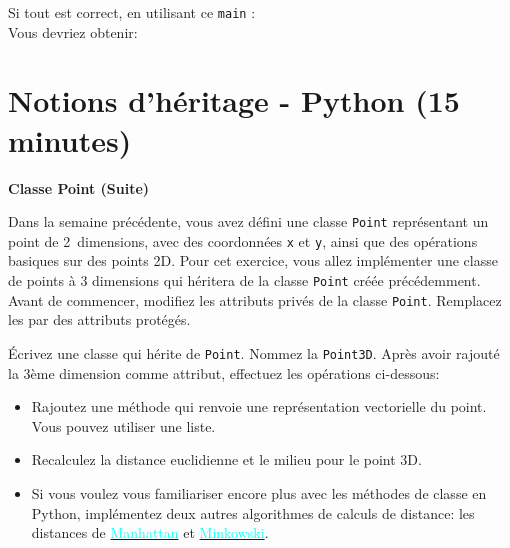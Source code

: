 Si tout est correct, en utilisant ce \lstinline{main} : \\

 

Vous devriez obtenir:
 



\section{Notions d'héritage - Python (15 minutes)}
\begin{Exercice}[15 minutes]\textbf{Classe Point (Suite)}

    Dans la semaine précédente, vous avez défini une classe \lstinline{Point} représentant un point de 2~dimensions, avec des coordonnées \lstinline{x} et \lstinline{y}, ainsi que des opérations basiques sur des points 2D. Pour cet exercice, vous allez implémenter une classe de points à 3 dimensions qui héritera de la classe \lstinline{Point} créée précédemment.
    Avant de commencer, modifiez les attributs privés de la classe \lstinline{Point}. Remplacez les par des attributs protégés.
    

    
    Écrivez une classe qui hérite de \lstinline{Point}. Nommez la \lstinline{Point3D}. Après avoir rajouté la 3ème dimension comme attribut, effectuez les opérations ci-dessous:
    
    \begin{itemize}
        \item Rajoutez une méthode qui renvoie une représentation vectorielle du point. Vous pouvez utiliser une liste.
        \item Recalculez la distance euclidienne et le milieu pour le point 3D.
        \item \advanced Si vous voulez vous familiariser encore plus avec les méthodes de classe en Python, implémentez deux autres algorithmes de calculs de distance: les distances de \href{https://fr.wikipedia.org/wiki/Distance_de_Manhattan}{\textcolor{cyan}{Manhattan}} et \href{https://en.wikipedia.org/wiki/Minkowski_distance}{\textcolor{cyan}{Minkowski}}.
    \end{itemize}


\end{Exercice}

